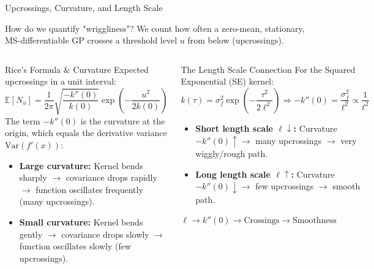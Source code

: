 \documentclass[aspectratio=169, 10pt]{beamer}
\begin{document}
\begin{frame}{Upcrossings, Curvature, and Length Scale}
  
  How do we quantify "wriggliness"? We count how often a zero-mean, stationary, MS-differentiable GP crosses a threshold level $u$ from below (upcrossings).
  
  \begin{columns}[t]
      \begin{block}{Rice's Formula \& Curvature}
        \scriptsize
        Expected upcrossings in a unit interval:
        \[
          \mathbb{E}[N_u] = \frac{1}{2\pi} \sqrt{\frac{-k''(0)}{k(0)}} \exp\left(-\frac{u^2}{2k(0)}\right)
        \]
        The term \textbf{$-k''(0)$} is the curvature at the origin, which equals the derivative variance $\text{Var}(f'(x))$:
        \begin{itemize}
          \item \textbf{Large curvature:} Kernel bends sharply $\to$ covariance drops rapidly $\to$ function oscillates frequently (many upcrossings).
          \item \textbf{Small curvature:} Kernel bends gently $\to$ covariance drops slowly $\to$ function oscillates slowly (few upcrossings).
        \end{itemize}
      \end{block}
      
      \begin{block}{The Length Scale Connection}
        \scriptsize
        For the Squared Exponential (SE) kernel:
        \[
          k(\tau) = \sigma_f^2 \exp\left(-\frac{\tau^2}{2\ell^2}\right) \Rightarrow -k''(0) = \frac{\sigma_f^2}{\ell^2} \propto \frac{1}{\ell^2}
        \]
        \begin{itemize}
          \item \textbf{Short length scale $\ell \downarrow$:} Curvature $-k''(0) \uparrow \to$ many upcrossings $\to$ very wiggly/rough path.
          \item \textbf{Long length scale $\ell \uparrow$:} Curvature $-k''(0) \downarrow \to$ few upcrossings $\to$ smooth path.
        \end{itemize}
        \vspace{6pt}
        \centering\textbf{$\ell \to k''(0) \to \text{Crossings} \to \text{Smoothness}$}
      \end{block}
  \end{columns}
\end{frame}
\end{document}
